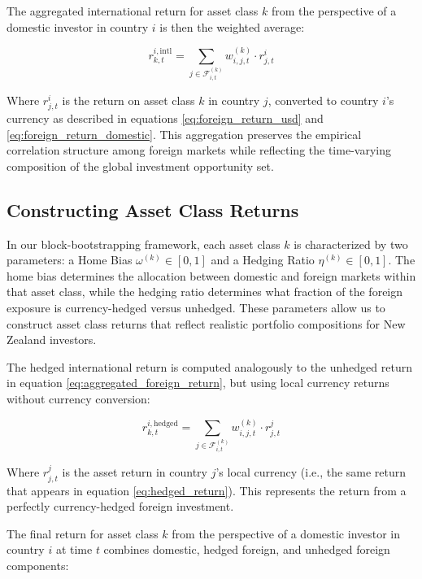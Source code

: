 \documentclass[11pt]{article}
\begin{document}
The aggregated international return for asset class $k$ from the perspective of a domestic investor in country $i$ is then the weighted average:

\begin{equation}\label{eq:aggregated_foreign_return}
  r^{i,\text{intl}}_{k,t} = \sum_{j \in \mathcal{F}^{(k)}_{i,t}} w^{(k)}_{i,j,t} \cdot r^{i}_{j,t}
\end{equation}

Where $r^{i}_{j,t}$ is the return on asset class $k$ in country $j$, converted to country $i$'s currency as described in equations \ref{eq:foreign_return_usd} and \ref{eq:foreign_return_domestic}. This aggregation preserves the empirical correlation structure among foreign markets while reflecting the time-varying composition of the global investment opportunity set.

 
\subsection{Constructing Asset Class Returns}

In our block-bootstrapping framework, each asset class $k$ is characterized by two parameters: a Home Bias $\omega^{(k)} \in [0,1]$ and a Hedging Ratio $\eta^{(k)} \in [0,1]$. The home bias determines the allocation between domestic and foreign markets within that asset class, while the hedging ratio determines what fraction of the foreign exposure is currency-hedged versus unhedged. These parameters allow us to construct asset class returns that reflect realistic portfolio compositions for New Zealand investors.

The hedged international return is computed analogously to the unhedged return in equation \ref{eq:aggregated_foreign_return}, but using local currency returns without currency conversion:

\begin{equation}\label{eq:aggregated_foreign_return_hedged}
  r^{i,\text{hedged}}_{k,t} = \sum_{j \in \mathcal{F}^{(k)}_{i,t}} w^{(k)}_{i,j,t} \cdot r^{j}_{j,t}
\end{equation}

Where $r^{j}_{j,t}$ is the asset return in country $j$'s local currency (i.e., the same return that appears in equation \ref{eq:hedged_return}). This represents the return from a perfectly currency-hedged foreign investment.

The final return for asset class $k$ from the perspective of a domestic investor in country $i$ at time $t$ combines domestic, hedged foreign, and unhedged foreign components:
\end{document}
